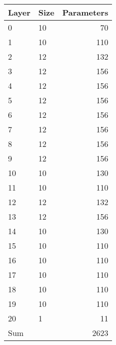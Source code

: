 \begin{tabular}{llr}
\toprule
 Layer   & Size   &   Parameters \\
\midrule
 0       & 10     &           70 \\
 1       & 10     &          110 \\
 2       & 12     &          132 \\
 3       & 12     &          156 \\
 4       & 12     &          156 \\
 5       & 12     &          156 \\
 6       & 12     &          156 \\
 7       & 12     &          156 \\
 8       & 12     &          156 \\
 9       & 12     &          156 \\
 10      & 10     &          130 \\
 11      & 10     &          110 \\
 12      & 12     &          132 \\
 13      & 12     &          156 \\
 14      & 10     &          130 \\
 15      & 10     &          110 \\
 16      & 10     &          110 \\
 17      & 10     &          110 \\
 18      & 10     &          110 \\
 19      & 10     &          110 \\
 20      & 1      &           11 \\
 Sum     &        &         2623 \\
\bottomrule
\end{tabular}
